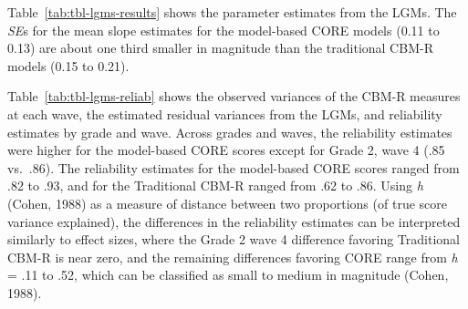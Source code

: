 \documentclass[
  english,
  man, fleqn, noextraspace]{apa6}
\begin{document}
Table~\ref{tab:tbl-lgms-results} shows the parameter estimates from the LGMs. The \emph{SE}s for the mean slope estimates for the model-based CORE models (0.11 to 0.13) are about one third smaller in magnitude than the traditional CBM-R models (0.15 to 0.21).

Table~\ref{tab:tbl-lgms-reliab} shows the observed variances of the CBM-R measures at each wave, the estimated residual variances from the LGMs, and reliability estimates by grade and wave. Across grades and waves, the reliability estimates were higher for the model-based CORE scores except for Grade 2, wave 4 (.85 vs.~.86). The reliability estimates for the model-based CORE scores ranged from .82 to .93, and for the Traditional CBM-R ranged from .62 to .86. Using \emph{h} (Cohen, 1988) as a measure of distance between two proportions (of true score variance explained), the differences in the reliability estimates can be interpreted similarly to effect sizes, where the Grade 2 wave 4 difference favoring Traditional CBM-R is near zero, and the remaining differences favoring CORE range from \emph{h} = .11 to .52, which can be classified as small to medium in magnitude (Cohen, 1988).
\end{document}
